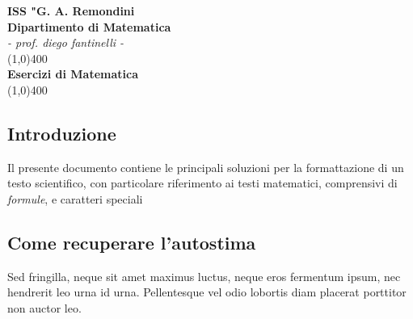 \documentclass[10pt, A4paper, landscape]{exam}
\theoremstyle{definition}
\theoremstyle{remark}
\begin{document}
	
	
\begin{center}

\Large{\textbf{ISS "G. A. Remondini}}\\
\Large{\textbf{Dipartimento di Matematica}}\\
\large{\em{- prof. diego fantinelli -}}\\
\vspace{0,5in} 
\line(1,0){400}\\[.5mm]
\huge{\textbf{Esercizi di Matematica}}\\
\line(1,0){400}\\[.5mm]
\vspace{0.5in} 

\end{center}


\setcounter{page}{1}
\begin{multicols}{2}
\section*{Introduzione}
Il presente documento contiene le principali soluzioni per la formattazione di un testo scientifico, con particolare riferimento ai testi matematici, comprensivi di \emph{formule}, e caratteri speciali

\subsection*{Come recuperare l'autostima}
Sed fringilla, neque sit amet maximus luctus, neque eros fermentum ipsum, nec hendrerit leo urna id urna. Pellentesque vel odio lobortis diam placerat porttitor non auctor leo.\\

\end{multicols}
\end{document}
